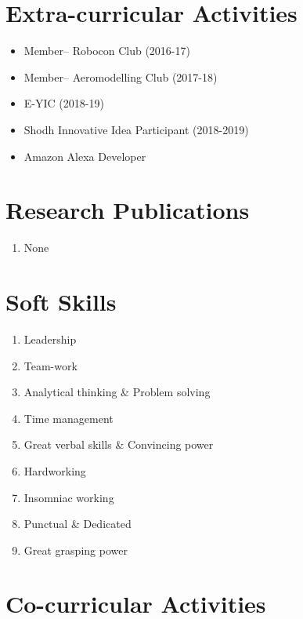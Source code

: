 \documentclass[margin,line]{res}
\begin{document}
\begin{resume}
\section{\sc \bf Extra-curricular Activities}
\begin{itemize}

\item Member-- Robocon Club (2016-17)
\item Member-- Aeromodelling Club (2017-18)
\item E-YIC (2018-19)
\item Shodh Innovative Idea Participant (2018-2019)
\item Amazon Alexa Developer

\end{itemize}

\section{\sc \bf Research Publications}

\begin{enumerate}

\item None

\end{enumerate}

\section{\sc \bf Soft Skills}
\begin{enumerate}

\item Leadership
\item Team-work
\item Analytical thinking \& Problem solving
\item Time management
\item Great verbal skills \& Convincing power
\item Hardworking
\item Insomniac working
\item Punctual \& Dedicated
\item Great grasping power

\end{enumerate}



\section{\sc \bf Co-curricular Activities}
\begin{enumerate}


\end{enumerate}
\end{resume}
\end{document}
